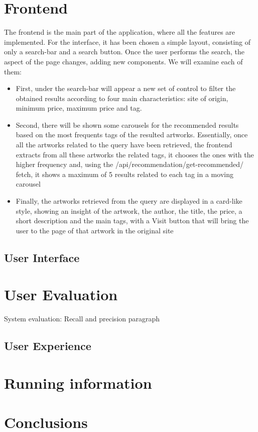 \documentclass[12pt]{spieman}  %
\begin{document}
\begin{spacing}{1}
    \section{Frontend}
    The frontend is the main part of the application, where all the features are implemented.\newline
    For the interface, it has been chosen a simple layout, consisting of only a search-bar and a search button. Once the user performs the search, the aspect of the page changes, adding new components. We will examine each of them:
    \begin{itemize}
        \item First, under the search-bar will appear a new set of control to filter the obtained results according to four main characteristics: site of origin, minimum price, maximum price and tag.
        \item Second, there will be shown some carousels for the recommended results based on the most frequents tags of the resulted artworks. Essentially, once all the artworks related to the query have been retrieved, the frontend extracts from all these artworks the related tags, it chooses the ones with the higher frequency and, using the /api/recommendation/get-recommended/ fetch, it shows a maximum of 5 results related to each tag in a moving carousel
        \item Finally, the artworks retrieved from the query are displayed in a card-like style, showing an insight of the artwork, the author, the title, the price, a short description and the main tags, with a Visit button that will bring the user to the page of that artwork in the original site
    \end{itemize}

    \subsection{User Interface}\label{sec:ui}

    \section{User Evaluation}
    System evaluation: Recall and precision paragraph

    \subsection{User Experience}\label{sec:ux}

    \section{Running information}

    \section{Conclusions}

\end{spacing}
\end{document}
